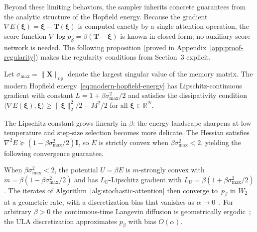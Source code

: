 Beyond these limiting behaviors, the sampler inherits concrete guarantees from the analytic structure of the Hopfield energy. Because the gradient $\nabla E(\boldsymbol{\xi})=\boldsymbol{\xi}-\mathbf{T}(\boldsymbol{\xi})$ is computed exactly by a single attention operation, the score function $\nabla\log p_\beta = \beta(\mathbf{T}-\boldsymbol{\xi})$ is known in closed form; no auxiliary score network is needed. The following proposition (proved in Appendix~\ref{app:proof-regularity}) makes the regularity conditions from Section~3 explicit.

\begin{proposition}\label{prop:regularity}
Let $\sigma_{\max}=\|\mathbf{X}\|_{\mathrm{op}}$ denote the largest singular value of the memory matrix. The modern Hopfield energy~\eqref{eq:modern-hopfield-energy} has Lipschitz-continuous gradient with constant $L = 1 + \beta\sigma_{\max}^{2}/2$ and satisfies the dissipativity condition $\langle \nabla E(\boldsymbol{\xi}),\boldsymbol{\xi}\rangle \ge \|\boldsymbol{\xi}\|_2^2/2 - M^2/2$ for all $\boldsymbol{\xi}\in\mathbb{R}^N$.
\end{proposition}

The Lipschitz constant grows linearly in $\beta$: the energy landscape sharpens at low temperature and step-size selection becomes more delicate. The Hessian satisfies $\nabla^2 E \succeq (1-\beta\sigma_{\max}^{2}/2)\mathbf{I}$, so $E$ is strictly convex when $\beta\sigma_{\max}^{2}<2$, yielding the following convergence guarantee.

\begin{corollary}\label{cor:convergence}
When $\beta\sigma_{\max}^{2}<2$, the potential $U=\beta E$ is $m$-strongly convex with $m=\beta(1-\beta\sigma_{\max}^{2}/2)$ and has $L_{U}$-Lipschitz gradient with $L_{U}=\beta(1+\beta\sigma_{\max}^{2}/2)$. The iterates of Algorithm~\ref{alg:stochastic-attention} then converge to~$p_\beta$ in $W_2$ at a geometric rate, with a discretization bias that vanishes as $\alpha\to 0$~\cite{dalalyanTheoreticalGuaranteesApproximate2017,durmusNonasymptoticAnalysisUnadjusted2017}. For arbitrary $\beta>0$ the continuous-time Langevin diffusion is geometrically ergodic~\cite{robertsTweedieExponentialConvergence1996}; the ULA discretization approximates $p_\beta$ with bias $O(\alpha)$.
\end{corollary}

